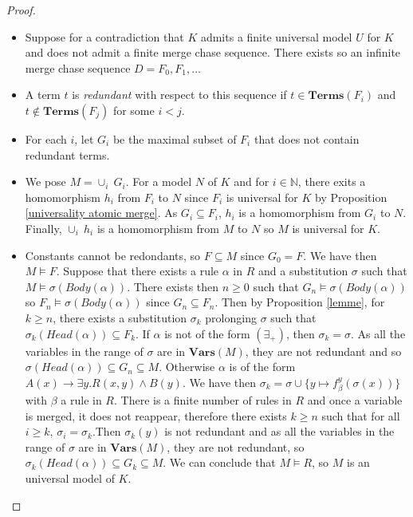 \documentclass{article}
\theoremstyle{definition}
\theoremstyle{remark}
\def \N {\mathbb N}
\newcommand{\Vars}{\textbf{Vars}}
\newcommand{\Terms}{\textbf{Terms}}
\begin{document}
\begin{proof}
\begin{itemize}
\item Suppose for a contradiction that $K$ admits a finite universal model $U$ for $K$ and does not admit a finite merge chase sequence. There exists so an infinite merge chase sequence $D= F_0, F_1, \ldots$
\item A term $t$ is \emph{redundant} with respect to this sequence if $t \in \Terms(F_i)$ and $t \notin \Terms(F_j)$ for some $i < j$.
\item For each $i$, let $G_i$ be the maximal subset of $F_i$ that does not contain redundant terms.

\item We pose $M = \cup_i~G_i$. For a model $N$ of $K$ and for $i \in \N$, there exits a homomorphism $h_i$ from $F_i$ to $N$ since $F_i$ is universal for $K$ by Proposition \ref{universality atomic merge}. As $G_i \subseteq F_i$, $h_i$ is a homomorphism from $G_i$ to $N$. Finally, $\cup_i~h_i$ is a homomorphism from $M$ to $N$ so $M$ is universal for $K$.

\item Constants cannot be redondants, so $F \subseteq M$ since $G_0 =F$. We have then $M \vDash F$. Suppose that there exists a rule $\alpha$ in $R$ and a substitution $\sigma$ such that $M \vDash \sigma(\textit{Body}(\alpha))$. There exists then $n \geq 0$ such that $G_n \vDash \sigma(\textit{Body}(\alpha))$ so $F_n \vDash \sigma(\textit{Body}(\alpha))$ since $G_n \subseteq F_n$. Then by Proposition \ref{lemme}, for $k \geq n$, there exists a substitution $\sigma_k$ prolonging $\sigma$ such that $\sigma_k(\textit{Head}(\alpha)) \subseteq F_k$. If $\alpha$ is not of the form $(\exists_+)$, then $\sigma_k = \sigma$. As all the variables in the range of $\sigma$ are in $\Vars(M)$, they are not redundant and so $\sigma(\textit{Head}(\alpha)) \subseteq G_n \subseteq M$. Otherwise $\alpha$ is of the form $A(x) \rightarrow \exists y.R(x,y) \wedge B(y)$. We have then $\sigma_k = \sigma \cup \{y \mapsto f_\beta^y(\sigma(x))\}$ with $\beta$ a rule in $R$. There is a finite number of rules in $R$ and once a variable is merged, it does not reappear, therefore there exists $k \geq n$ such that for all $i \geq k$, $\sigma_i = \sigma_k$.Then $\sigma_k(y)$ is not redundant and as all the variables in the range of $\sigma$ are in $\Vars(M)$, they are not redundant, so $\sigma_k(\textit{Head}(\alpha)) \subseteq G_k \subseteq M$. We can conclude that $M \vDash R$, so $M$ is an universal model of $K$.



\end{itemize}
\end{proof}
\end{document}
